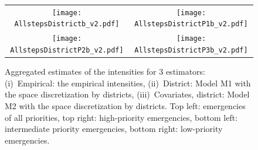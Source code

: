 \documentclass[article]{jss}
\begin{document}
\begin{figure}
\centering
\begin{tabular}{cc}
\texttt{[image: AllstepsDistrictb\_v2.pdf]}&
\texttt{[image: AllstepsDistrictP1b\_v2.pdf]}\\
\texttt{[image: AllstepsDistrictP2b\_v2.pdf]}&
\texttt{[image: AllstepsDistrictP3b\_v2.pdf]}
\end{tabular}
\caption{Aggregated estimates of the intensities for 3 estimators: (i)~Empirical: the empirical intensities, (ii)~District: Model M1 with the space discretization by districts, (iii)~Covariates, district: Model M2 with the space discretization by districts.
Top left: emergencies of all priorities, top right: high-priority emergencies, bottom left: intermediate priority emergencies, bottom right: low-priority emergencies.
\label{fig:allstepsdist}}
\end{figure}


\end{document}
